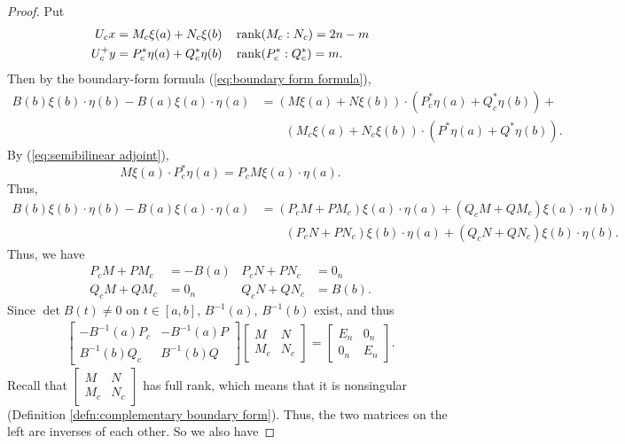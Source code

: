\documentclass[11pt, oneside, a4paper]{article}
\begin{document}
\begin{proof}
    Put
    \begin{align*}
        U_cx &= M_c\xi(a) + N_c\xi(b)\quad \operatorname{rank}(M_c:N_c) = 2n-m\\
        U_c^+y &= P_c^*\eta(a) + Q_c^*\eta(b)\quad\operatorname{rank}(P_c^*:Q_c^*)=m.
    \end{align*}
    Then by the boundary-form formula (\ref{eq:boundary form formula}),
    \begin{align*}
        B(b)\xi(b)\cdot \eta(b) - B(a)\xi(a)\cdot \eta(a) &= (M\xi(a) + N\xi(b))\cdot (P_c^*\eta(a) + Q_c^*\eta(b)) + \\
        &\qquad (M_c\xi(a) + N_c\xi(b))\cdot (P^*\eta(a) + Q^*\eta(b)).
    \end{align*}
    By (\ref{eq:semibilinear adjoint}), 
    \[M\xi(a)\cdot P_c^*\eta(a) = P_cM\xi(a)\cdot \eta(a).\]
    Thus,
    \begin{align*}
        B(b)\xi(b)\cdot \eta(b) - B(a)\xi(a)\cdot \eta(a) &= (P_c M + PM_c)\xi(a)\cdot \eta(a) + (Q_cM + QM_c)\xi(a)\cdot \eta(b) \\
        &\qquad (P_cN + PN_c) \xi(b)\cdot \eta(a) + (Q_cN + QN_c) \xi(b)\cdot \eta(b).
    \end{align*}
    Thus, we have
    \begin{align*}
        P_cM + PM_c &= - B(a) & P_cN + PN_c &= 0_n\\
        Q_cM + QM_c &= 0_n & Q_cN + QN_c &= B(b).
    \end{align*}
    Since $\det B(t)\neq 0$ on $t\in[a,b]$, $B^{-1}(a)$, $B^{-1}(b)$ exist, and thus
    \begin{align*}
        \begin{bmatrix}
            -B^{-1}(a)P_c & -B^{-1}(a)P\\
            B^{-1}(b)Q_c & B^{-1}(b)Q
        \end{bmatrix}
        \begin{bmatrix}
            M & N\\
            M_c & N_c
        \end{bmatrix}
        =
        \begin{bmatrix}
            E_n & 0_n\\
            0_n & E_n
        \end{bmatrix}.
    \end{align*}
    Recall that $\begin{bmatrix}
        M & N\\
        M_c & N_c
    \end{bmatrix}$ has full rank, which means that it is nonsingular (Definition \ref{defn:complementary boundary form}). Thus, the two matrices on the left are inverses of each other. So we also have

\end{proof}
\end{document}
